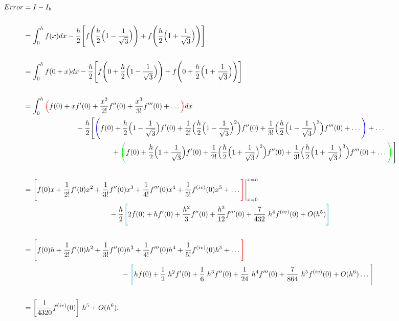 \documentclass[paper=a4, fontsize=11pt]{scrartcl} %
\numberwithin{equation}{section} %
\numberwithin{figure}{section} %
\numberwithin{table}{section} %
\begin{document}
\begin{itemize}
\begin{align}
\nonumber
\begin{split}
Error &= I - I_h \\ \\
	&= \int_0^h f(x) dx -  \frac{h}{2} \Bigg[ f\Bigg( \frac{h}{2}\Big(1-\frac{1}{\sqrt{3}}\Big) \Bigg) + f\Bigg( \frac{h}{2}\Big(1+\frac{1}{\sqrt{3}} \Big) \Bigg) \Bigg] \\ \\
	&= \int_0^h f(0+x) dx - \frac{h}{2} \Bigg[f\Bigg(0 + \frac{h}{2}\Big(1-\frac{1}{\sqrt{3}}\Big) \Bigg) + f\Bigg(0 + \frac{h}{2}\Big(1+\frac{1}{\sqrt{3}} \Big) \Bigg)  \Bigg] \\ \\
	&=\int_0^h \textcolor{red}{\Big(} f(0) + xf'(0) +\frac{x^2}{2!} f''(0) + \frac{x^3}{3!} f'''(0) +\ldots \textcolor{red}{\Big)}dx   \\
	&\ \ \ \ \ \ \ \ \ \ \ \ \ \ \ \ \ \ \ \ \ \ - \frac{h}{2} \Bigg[ \textcolor{blue}{\Bigg(} f(0) +\frac{h}{2}\Big(1-\frac{1}{\sqrt{3}}\Big) f'(0) +\frac{1}{2!} \Big(\frac{h}{2}\Big(1-\frac{1}{\sqrt{3}}\Big)^2 \Big) f''(0) + \frac{1}{3!}  \Big(\frac{h}{2}\Big(1-\frac{1}{\sqrt{3}}\Big)^3 \Big) f'''(0) +\ldots \textcolor{blue}{\Bigg)} + \ldots \\
	&\ \ \ \ \ \ \ \ \ \ \ \ \ \ \ \ \ \ \ \ \ \ \ \ \ \ \ \ \ \ \ \ \ \ \ \ \  + \textcolor{green}{\Bigg(} f(0) +\frac{h}{2}\Big(1+\frac{1}{\sqrt{3}}\Big) f'(0) +\frac{1}{2!} \Big(\frac{h}{2}\Big(1+\frac{1}{\sqrt{3}}\Big)^2 \Big) f''(0) + \frac{1}{3!}  \Big(\frac{h}{2}\Big(1+\frac{1}{\sqrt{3}}\Big)^3 \Big) f'''(0) +\ldots \textcolor{green}{\Bigg)} \Bigg]\\ \\ 
	&=\textcolor{red}{\Bigg[} f(0)x + \frac{1}{2!}f'(0)x^2 + \frac{1}{3!}f''(0)x^3+ \frac{1}{4!}f'''(0)x^4 + \frac{1}{5!} f^{(iv)}(0) x^5 +\ldots \textcolor{red}{\Bigg]}\Bigg|_{x=0}^{x=h}\\  
	&\ \ \ \ \ \ \ \ \ \ \ \ \ \ \ \ \ \ \ \ \ \ \ \ \ \ \ \ \ \ \ \ \ \ \ \ - \frac{h}{2} \textcolor{cyan}{\Bigg[} 2f(0)+hf'(0) + \frac{h^2}{3} f''(0) + \frac{h^3}{12} f'''(0) + \frac{7}{432}\ h^4 f^{(iv)}(0) + O(h^5)  \textcolor{cyan}{\Bigg]}\\ \\ 	
	&=\textcolor{red}{\Bigg[} f(0)h + \frac{1}{2!}f'(0)h^2 + \frac{1}{3!}f''(0)h^3+ \frac{1}{4!}f'''(0)h^4 + \frac{1}{5!} f^{(iv)}(0) h^5+\ldots \textcolor{red}{\Bigg]}  \\  
	&\ \ \ \ \ \ \ \ \ \ \ \ \ \ \ \ \ \ \ \ \ \ \ \ \ \ \ \ \ \ \ \ \ \ \ \ \ \ \ \  \ - \textcolor{cyan}{\Bigg[} h f(0) + \frac{1}{2}\ h^2 f'(0) + \frac{1}{6}\ h^3 f''(0)  + \frac{1}{24}\ h^4 f'''(0) + \frac{7}{864}\ h^5 f^{(iv)}(0) + O(h^6) \ldots \textcolor{cyan}{\Bigg]}  \\ \\
	&=\bigg[ \frac{1}{4320} f^{(iv)}(0) \bigg]\ h^5 + O(h^6).\\ \\\end{split}
\end{align}
 

\end{itemize}
\end{document}
